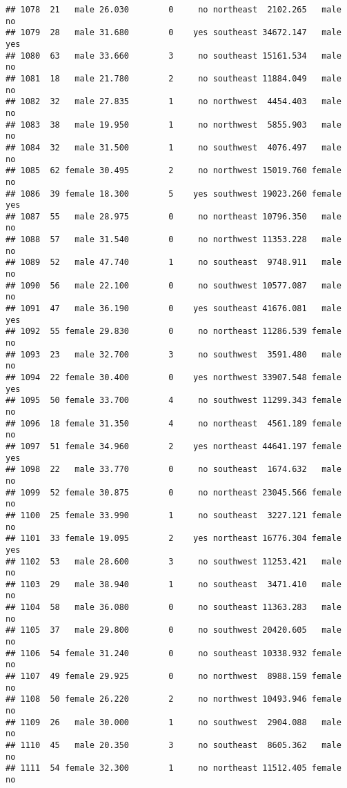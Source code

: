 \documentclass[
]{article}
\begin{document}
\begin{verbatim}
## 1078  21   male 26.030        0     no northeast  2102.265   male       no
## 1079  28   male 31.680        0    yes southeast 34672.147   male      yes
## 1080  63   male 33.660        3     no southeast 15161.534   male       no
## 1081  18   male 21.780        2     no southeast 11884.049   male       no
## 1082  32   male 27.835        1     no northwest  4454.403   male       no
## 1083  38   male 19.950        1     no northwest  5855.903   male       no
## 1084  32   male 31.500        1     no southwest  4076.497   male       no
## 1085  62 female 30.495        2     no northwest 15019.760 female       no
## 1086  39 female 18.300        5    yes southwest 19023.260 female      yes
## 1087  55   male 28.975        0     no northeast 10796.350   male       no
## 1088  57   male 31.540        0     no northwest 11353.228   male       no
## 1089  52   male 47.740        1     no southeast  9748.911   male       no
## 1090  56   male 22.100        0     no southwest 10577.087   male       no
## 1091  47   male 36.190        0    yes southeast 41676.081   male      yes
## 1092  55 female 29.830        0     no northeast 11286.539 female       no
## 1093  23   male 32.700        3     no southwest  3591.480   male       no
## 1094  22 female 30.400        0    yes northwest 33907.548 female      yes
## 1095  50 female 33.700        4     no southwest 11299.343 female       no
## 1096  18 female 31.350        4     no northeast  4561.189 female       no
## 1097  51 female 34.960        2    yes northeast 44641.197 female      yes
## 1098  22   male 33.770        0     no southeast  1674.632   male       no
## 1099  52 female 30.875        0     no northeast 23045.566 female       no
## 1100  25 female 33.990        1     no southeast  3227.121 female       no
## 1101  33 female 19.095        2    yes northeast 16776.304 female      yes
## 1102  53   male 28.600        3     no southwest 11253.421   male       no
## 1103  29   male 38.940        1     no southeast  3471.410   male       no
## 1104  58   male 36.080        0     no southeast 11363.283   male       no
## 1105  37   male 29.800        0     no southwest 20420.605   male       no
## 1106  54 female 31.240        0     no southeast 10338.932 female       no
## 1107  49 female 29.925        0     no northwest  8988.159 female       no
## 1108  50 female 26.220        2     no northwest 10493.946 female       no
## 1109  26   male 30.000        1     no southwest  2904.088   male       no
## 1110  45   male 20.350        3     no southeast  8605.362   male       no
## 1111  54 female 32.300        1     no northeast 11512.405 female       no

\end{verbatim}
\end{document}
